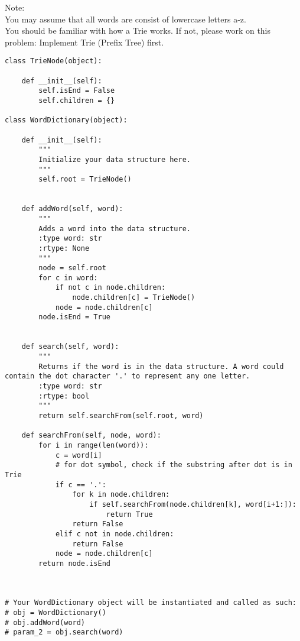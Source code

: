 Note:\\
You may assume that all words are consist of lowercase letters a-z.\\
You should be familiar with how a Trie works. If not, please work on this problem: Implement Trie (Prefix Tree) first. \\

\begin{lstlisting}
class TrieNode(object):
    
    def __init__(self):
        self.isEnd = False
        self.children = {}

class WordDictionary(object):

    def __init__(self):
        """
        Initialize your data structure here.
        """
        self.root = TrieNode()
        

    def addWord(self, word):
        """
        Adds a word into the data structure.
        :type word: str
        :rtype: None
        """
        node = self.root
        for c in word:
            if not c in node.children:
                node.children[c] = TrieNode()
            node = node.children[c]
        node.isEnd = True
        

    def search(self, word):
        """
        Returns if the word is in the data structure. A word could contain the dot character '.' to represent any one letter.
        :type word: str
        :rtype: bool
        """
        return self.searchFrom(self.root, word)

    def searchFrom(self, node, word):
        for i in range(len(word)):
            c = word[i]
            # for dot symbol, check if the substring after dot is in Trie
            if c == '.':
                for k in node.children:
                    if self.searchFrom(node.children[k], word[i+1:]):
                        return True
                return False
            elif c not in node.children:
                return False
            node = node.children[c]
        return node.isEnd
        


# Your WordDictionary object will be instantiated and called as such:
# obj = WordDictionary()
# obj.addWord(word)
# param_2 = obj.search(word)
\end{lstlisting}


